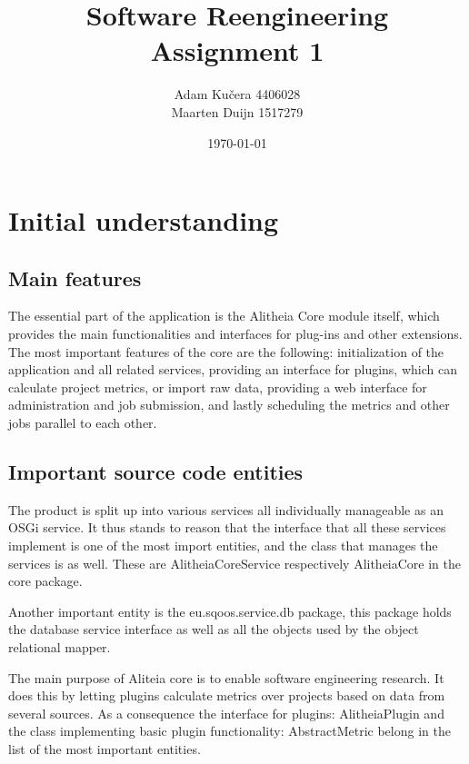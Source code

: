 \documentclass[a4paper,11pt,titlepage]{article}
\author{Adam Ku\v{c}era 4406028\\Maarten Duijn 1517279}
\title{Software Reengineering Assignment 1}
\date{\today}
\begin{document}
\maketitle

\section{Initial understanding}
\subsection{Main features}
The essential part of the application is the Alitheia Core module itself, which provides the main functionalities and interfaces for plug-ins and other extensions. The most important features of the core are the following: initialization of the application and all related services, providing an interface for plugins, which can calculate project metrics, or import raw data, providing a web interface for administration and job submission, and lastly scheduling the metrics and other jobs parallel to each other.

%

\subsection{Important source code entities}
The product is split up into various services all individually manageable as an OSGi service. It thus stands to reason that the interface that all these services implement is one of the most import entities, and the class that manages the services is as well. These are AlitheiaCoreService respectively AlitheiaCore in the core package.

Another important entity is the eu.sqoos.service.db package, this package holds the database service interface as well as all the objects used by the object relational mapper.

The main purpose of Aliteia core is to enable software engineering research. It does this by letting plugins calculate metrics over projects based on data from several sources. As a consequence the interface for plugins: AlitheiaPlugin and the class implementing basic plugin functionality: AbstractMetric belong in the list of the most important entities.
\end{document}
